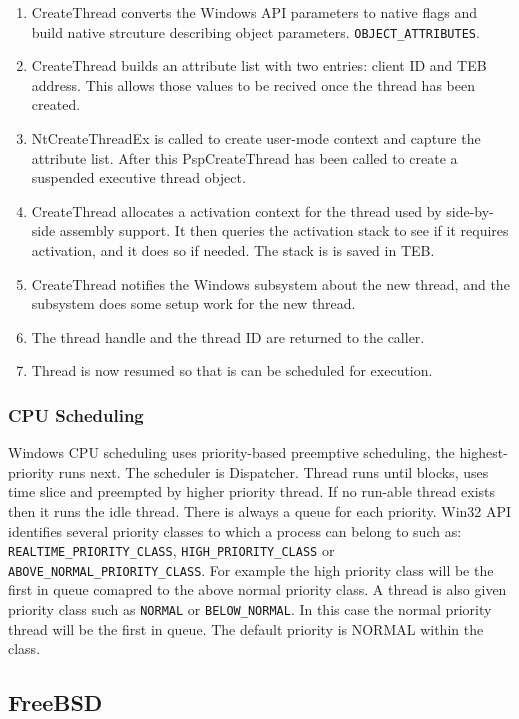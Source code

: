 \documentclass[letterpaper,10pt,draftclsnofoot,onecolumn]{IEEEtran}
\begin{document}
\begin{enumerate}
\item CreateThread converts the Windows API parameters to native flags and build native strcuture describing object parameters. \verb|OBJECT_ATTRIBUTES|.
\item CreateThread builds an attribute list with two entries: client ID and TEB address. This allows those values to be recived once the thread has been created.
\item NtCreateThreadEx is called to create user-mode context and capture the attribute list. After this PspCreateThread has been called to create a suspended executive thread object.
\item CreateThread allocates a activation context for the thread used by side-by-side assembly support. It then queries the activation stack to see if it requires activation, and it does so if needed. The stack is is saved in TEB.
\item CreateThread notifies the Windows subsystem about the new thread, and the subsystem does some setup work for the new thread.
\item The thread handle and the thread ID are returned to the caller.
\item Thread is now resumed so that is can be scheduled for execution. 
\end{enumerate}

\subsubsection*{CPU Scheduling}

Windows CPU scheduling uses priority-based preemptive scheduling, the highest-priority runs next. The scheduler is Dispatcher. Thread runs until blocks, uses time slice and preempted by higher priority thread. If no run-able thread exists then it runs the idle thread. There is always a queue for each priority. Win32 API identifies several priority classes to which a process can belong to such as: \verb|REALTIME_PRIORITY_CLASS|, \verb|HIGH_PRIORITY_CLASS| or \verb|ABOVE_NORMAL_PRIORITY_CLASS|. For example the high priority class will be the first in queue comapred to the above normal priority class. A thread is also given priority class such as \verb|NORMAL| or \verb|BELOW_NORMAL|. In this case the normal priority thread will be the first in queue. The default priority is NORMAL within the class.

\subsection*{FreeBSD}
\end{document}
